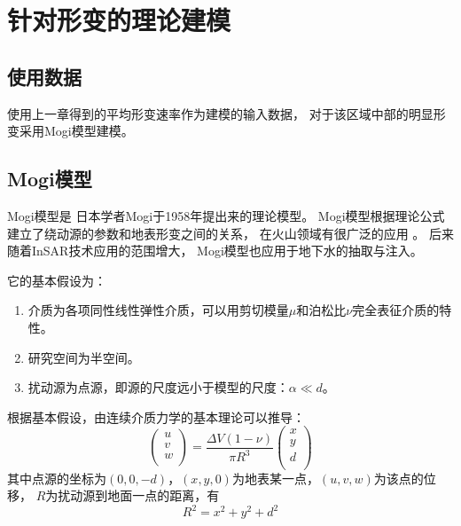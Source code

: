 \chapter{针对形变的理论建模}

\section{使用数据}
使用上一章得到的平均形变速率作为建模的输入数据，
对于该区域中部的明显形变采用Mogi模型建模。

\section{Mogi模型}
Mogi模型\cite{mogiRelationsEruptionsVarious1958}是
日本学者Mogi于1958年提出来的理论模型。
Mogi模型根据理论公式建立了绕动源的参数和地表形变之间的关系，
在火山领域有很广泛的应用
\cite{luSatelliteRadarInterferometry1998,luSyntheticApertureRadar2000,
luMagmaticInflationDormant2002,luInterferometricSyntheticAperture2005,
luGroundSurfaceDeformation2010}。
后来随着InSAR技术应用的范围增大，
Mogi模型也应用于地下水的抽取与注入\cite{zhengWastewaterLeakageWest2019}。

它的基本假设为：
\begin{enumerate}
    \item 介质为各项同性线性弹性介质，可以用剪切模量$\mu$和泊松比$\nu$完全表征介质的特性。
    \item 研究空间为半空间。
    \item 扰动源为点源，即源的尺度远小于模型的尺度：$\alpha \ll d$。
\end{enumerate}

根据基本假设，由连续介质力学的基本理论可以推导：
\begin{equation}
    \left(\begin{array}{c}
        u \\ v \\ w \\
    \end{array}\right)
    =\frac{\Delta V(1-\nu)}{\pi R^3}
    \left(\begin{array}{c}
        x \\ y \\ d \\
    \end{array}\right)
    \label{eq:mogi}
\end{equation}
其中点源的坐标为$(0,0,-d)$，$(x,y,0)$为地表某一点，$(u,v,w)$为该点的位移，
$R$为扰动源到地面一点的距离，有
\begin{equation}
    R^2=x^2+y^2+d^2
\end{equation}

